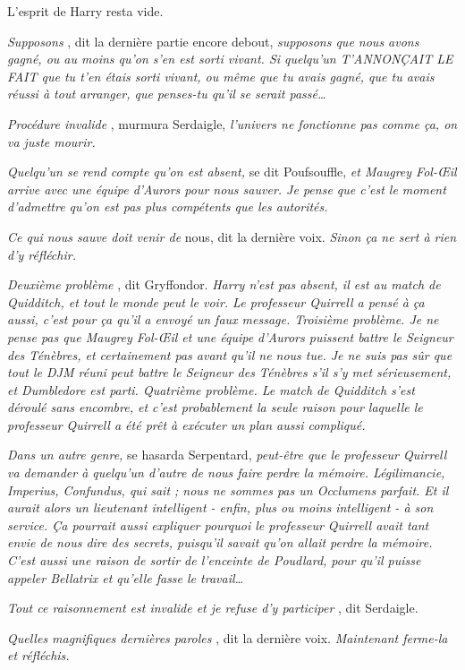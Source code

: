 L'esprit de Harry resta vide.

\emph{Supposons} , dit la dernière partie encore debout, \emph{supposons que nous avons gagné, ou au moins qu'on s'en est sorti vivant. Si quelqu'un T'ANNONÇAIT LE FAIT que tu t'en étais sorti vivant, ou même que tu avais gagné, que tu avais réussi à tout arranger, que penses-tu qu'il se serait passé…} 

\emph{Procédure invalide} , murmura Serdaigle, \emph{l'univers ne fonctionne pas comme ça, on va juste mourir.} 

\emph{Quelqu'un se rend compte qu'on est absent,}  se dit Poufsouffle, \emph{et Maugrey Fol-Œil arrive avec une équipe d'Aurors pour nous sauver. Je pense que c'est le moment d'admettre qu'on est pas plus compétents que les autorités.} 

\emph{Ce qui nous sauve doit venir de } nous, dit la dernière voix. \emph{Sinon ça ne sert à rien d'y réfléchir.} 

\emph{Deuxième problème} , dit Gryffondor. \emph{Harry n'est pas absent, il est au match de Quidditch, et tout le monde peut le voir. Le professeur Quirrell a pensé à ça aussi, c'est pour ça qu'il a envoyé un faux message. Troisième problème. Je ne pense pas que Maugrey Fol-Œil et une équipe d'Aurors puissent battre le Seigneur des Ténèbres, et certainement pas avant qu'il ne nous tue. Je ne suis pas sûr que tout le DJM réuni peut battre le Seigneur des Ténèbres s'il s'y met sérieusement, et Dumbledore est parti. Quatrième problème. Le match de Quidditch s'est déroulé sans encombre, et c'est probablement la seule raison pour laquelle le professeur Quirrell a été prêt à exécuter un plan aussi compliqué.} 

\emph{Dans un autre genre,}  se hasarda Serpentard, \emph{peut-être que le professeur Quirrell va demander à quelqu'un d'autre de nous faire perdre la mémoire. Légilimancie, Imperius, Confundus, qui sait ; nous ne sommes pas un Occlumens parfait. Et il aurait alors un lieutenant intelligent - enfin, plus ou moins intelligent - à son service. Ça pourrait aussi expliquer pourquoi le professeur Quirrell avait tant envie de nous dire des secrets, puisqu'il savait qu'on allait perdre la mémoire. C'est aussi une raison de sortir de l'enceinte de Poudlard, pour qu'il puisse appeler Bellatrix et qu'elle fasse le travail…} 

\emph{Tout ce raisonnement est invalide et je refuse d'y participer} , dit Serdaigle.

\emph{Quelles magnifiques dernières paroles} , dit la dernière voix. \emph{Maintenant ferme-la et réfléchis.} 

